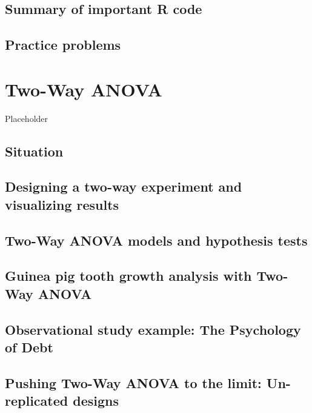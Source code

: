 \documentclass[]{book}
\begin{document}
\hypertarget{section3-9}{%
\section{Summary of important R code}\label{section3-9}}

\hypertarget{section3-10}{%
\section{Practice problems}\label{section3-10}}

\hypertarget{chapter4}{%
\chapter{Two-Way ANOVA}\label{chapter4}}

Placeholder

\hypertarget{section4-1}{%
\section{Situation}\label{section4-1}}

\hypertarget{section4-2}{%
\section{Designing a two-way experiment and visualizing results}\label{section4-2}}

\hypertarget{section4-3}{%
\section{Two-Way ANOVA models and hypothesis tests}\label{section4-3}}

\hypertarget{section4-4}{%
\section{Guinea pig tooth growth analysis with Two-Way ANOVA}\label{section4-4}}

\hypertarget{section4-5}{%
\section{Observational study example: The Psychology of Debt}\label{section4-5}}

\hypertarget{section4-6}{%
\section{Pushing Two-Way ANOVA to the limit: Un-replicated designs}\label{section4-6}}
\end{document}

